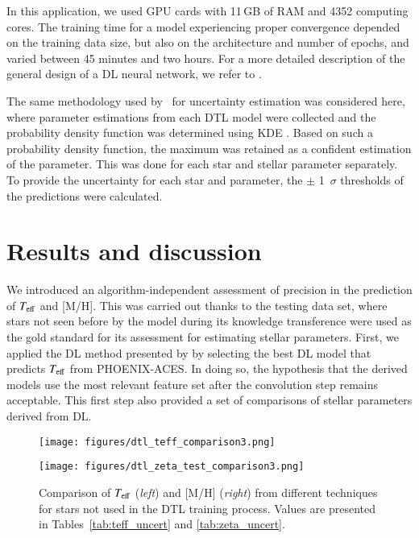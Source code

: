 \documentclass{aa}
\begin{document}
In this application, we used GPU cards with 11\,GB of RAM and 4352 computing cores.
The training time for a model experiencing proper convergence depended on the training data size, but also on the architecture and number of epochs, and varied between 45 minutes and two hours.
For a more detailed description of the general design of a DL neural network, we refer to \citet{Passegger2020}. 

The same methodology used by~\cite{Passegger2020} for uncertainty estimation was considered here, where parameter estimations from each DTL model were collected and the probability density function was determined using KDE \citep{scott2015multivariate,terrell1992variable,wang2017robust}.
Based on such a probability {density} function, the maximum was retained as a confident estimation of the parameter. This was done for each star and stellar parameter separately. To provide the uncertainty for each star and
parameter, the $\pm$ 1~$\sigma$ thresholds of the predictions were calculated.

\section{Results and discussion}
\label{Results}

We introduced an algorithm-independent assessment of precision in the prediction of $T_{\rm eff}$ and [M/H]. This was carried out thanks to the testing data set, where stars not seen before by the model during its knowledge transference were used as the gold standard for its assessment for estimating stellar parameters.
First, we applied the DL method presented by \cite{Passegger2020} by selecting the best DL model that predicts $T_{\rm eff}$ from PHOENIX-ACES. In doing so, the hypothesis that the derived models use the most relevant feature set after the convolution step remains acceptable. This first step also provided a set of comparisons of stellar parameters derived from DL.



\begin{figure*}
  \centering
      \begin{minipage}{0.49\textwidth}
        \centering
        \texttt{[image: figures/dtl\_teff\_comparison3.png]}  
    \end{minipage}\hfill
    \begin{minipage}{0.49\textwidth}
        \centering
        \texttt{[image: figures/dtl\_zeta\_test\_comparison3.png]}  
    \end{minipage}\hfill
    \caption{Comparison of $T_{\rm eff}$ ({\it left}) and [M/H] ({\it right}) from different techniques for stars not used in the DTL training process. Values are presented in Tables~\ref{tab:teff_uncert} and \ref{tab:zeta_uncert}.}
    \label{fig:dtl_ref_teff_zeta}
\end{figure*}
\end{document}
